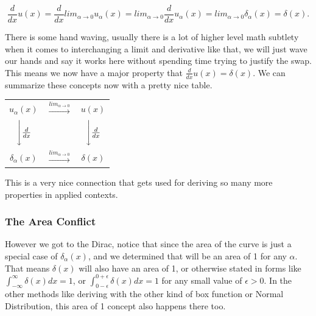\documentclass[12pt]{article}
\begin{document}
\begin{equation*}
    \frac{d}{dx}u(x)=\frac{d}{dx}lim_{\alpha\rightarrow0} u_{\alpha}(x)=lim_{\alpha\rightarrow0} \frac{d}{dx}u_{\alpha}(x) = lim_{\alpha\rightarrow0} \delta_{\alpha}(x) = \delta(x).
\end{equation*}

There is some hand waving, usually there is a lot of higher level math subtlety when it comes to interchanging a limit and derivative like that, we will just wave our hands and say it works here without spending time trying to justify the swap. This means we now have a major property that $\frac{d}{dx}u(x)=\delta(x)$. We can summarize these concepts now with a pretty nice table.

\begin{center}
  \begin{tabular}{ c  c  c  }
    $u_{\alpha}(x)$  & $\xrightarrow{lim_{\alpha\rightarrow0}}$ & $u(x)$ \\
     $\Bigg\downarrow \frac{d}{dx}$ & & $\Bigg\downarrow \frac{d}{dx}$ \\
     $\delta_{\alpha}(x)$ & $\xrightarrow{lim_{\alpha\rightarrow0}}$ & $\delta(x)$ \\
  \end{tabular}
\end{center}

This is a very nice connection that gets used for deriving so many more properties in applied contexts.

\subsubsection{The Area Conflict}

However we got to the Dirac, notice that since the area of the curve is just a special case of $\delta_{\alpha}(x)$, and we determined that will be an area of 1 for any $\alpha$. That means $\delta(x)$ will also have an area of 1, or otherwise stated in forms like $\int_{-\infty}^{\infty} \delta(x)dx=1$, or $\int_{0-\epsilon}^{0+\epsilon} \delta(x)dx=1$ for any small value of $\epsilon>0$. In the other methods like deriving with the other kind of box function or Normal Distribution, this area of 1 concept also happens there too. \\
\end{document}
